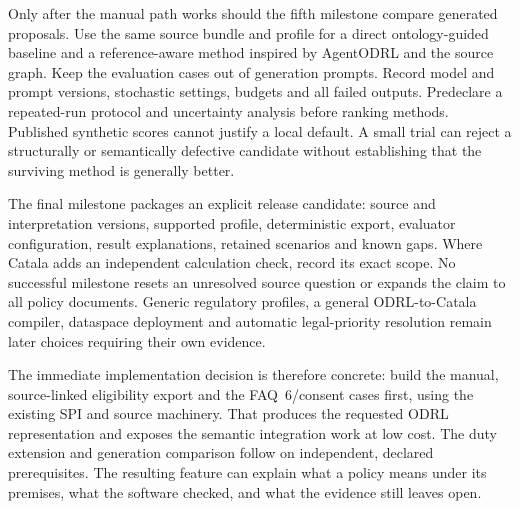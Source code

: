 Only after the manual path works should the fifth milestone compare generated
proposals. Use the same source bundle and profile for a direct ontology-guided
baseline and a reference-aware method inspired by AgentODRL and the source
graph. Keep the evaluation cases out of generation prompts. Record model and
prompt versions, stochastic settings, budgets and all failed outputs.
Predeclare a repeated-run protocol and uncertainty analysis before ranking
methods. Published synthetic scores cannot justify a local default. A small
trial can reject a structurally or semantically defective candidate without
establishing that the surviving method is generally better.

The final milestone packages an explicit release candidate: source and
interpretation versions, supported profile, deterministic export, evaluator
configuration, result explanations, retained scenarios and known gaps.
Where Catala adds an independent calculation check, record its exact scope.
No successful milestone resets an unresolved source question or expands the
claim to all policy documents. Generic regulatory profiles, a general
ODRL-to-Catala compiler, dataspace deployment and automatic legal-priority
resolution remain later choices requiring their own evidence.

The immediate implementation decision is therefore concrete: build the
manual, source-linked eligibility export and the FAQ~6/consent cases first,
using the existing SPI and source machinery. That produces the requested
ODRL representation and exposes the semantic integration work at low cost.
The duty extension and generation comparison follow on independent, declared
prerequisites. The resulting feature can explain what a policy means under
its premises, what the software checked, and what the evidence still leaves
open.
